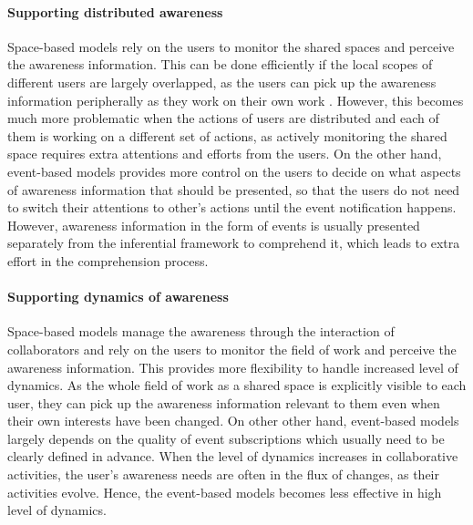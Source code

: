 \paragraph*{Supporting distributed awareness} %
\label{par:supporting_distributed_awareness}
Space-based models rely on the users to monitor the shared spaces and perceive the awareness information. This can be done efficiently if the local scopes of different users are largely overlapped, as the users can pick up the awareness information peripherally as they work on their own work \cite{schmidt2002a}. However, this becomes much more problematic when the actions of users are distributed and each of them is working on a different set of actions, as actively monitoring the shared space requires extra attentions and efforts from the users. On the other hand, event-based models provides more control on the users to decide on what aspects of awareness information that should be presented, so that the users do not need to switch their attentions to other’s actions until the event notification happens. However, awareness information in the form of events is usually presented separately from the inferential framework to comprehend it, which leads to extra effort in the comprehension process.

\paragraph*{Supporting dynamics of awareness} %
\label{par:supporting_dynamics_of_awareness}
Space-based models manage the awareness through the interaction of collaborators and rely on the users to monitor the field of work and perceive the awareness information. This provides more flexibility to handle increased level of dynamics. As the whole field of work as a shared space is explicitly visible to each user, they can pick up the awareness information relevant to them even when their own interests have been changed. On other other hand, event-based models largely depends on the quality of event subscriptions which usually need to be clearly defined in advance. When the level of dynamics increases in collaborative activities, the user's awareness needs are often in the flux of changes, as their activities evolve. Hence, the event-based models becomes less effective in high level of dynamics.

